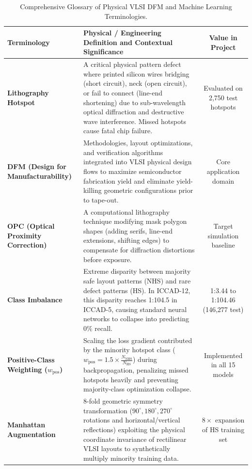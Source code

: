 \documentclass[11pt,journal,onecolumn]{IEEEtran}
\begin{document}
\begin{table}[htbp]
\caption{Comprehensive Glossary of Physical VLSI DFM and Machine Learning Terminologies.}
\label{tab:glossary}
\centering
\small
\begin{tabular}{p{4.2cm}p{9.8cm}c}
\toprule
\textbf{Terminology} & \textbf{Physical / Engineering Definition and Contextual Significance} & \textbf{Value in Project} \\
\midrule
\textbf{Lithography Hotspot} & A critical physical pattern defect where printed silicon wires bridging (short circuit), neck (open circuit), or fail to connect (line-end shortening) due to sub-wavelength optical diffraction and destructive wave interference. Missed hotspots cause fatal chip failure. & Evaluated on 2,750 test hotspots \\
\addlinespace
\textbf{DFM (Design for Manufacturability)} & Methodologies, layout optimizations, and verification algorithms integrated into VLSI physical design flows to maximize semiconductor fabrication yield and eliminate yield-killing geometric configurations prior to tape-out. & Core application domain \\
\addlinespace
\textbf{OPC (Optical Proximity Correction)} & A computational lithography technique modifying mask polygon shapes (adding serifs, line-end extensions, shifting edges) to compensate for diffraction distortions before exposure. & Target simulation baseline \\
\addlinespace
\textbf{Class Imbalance} & Extreme disparity between majority safe layout patterns (NHS) and rare defect patterns (HS). In ICCAD-12, this disparity reaches 1:104.5 in ICCAD-5, causing standard neural networks to collapse into predicting 0\% recall. & 1:3.44 to 1:104.46 (146,277 test) \\
\addlinespace
\textbf{Positive-Class Weighting ($w_{\text{pos}}$)} & Scaling the loss gradient contributed by the minority hotspot class ($w_{\text{pos}} = 1.5 \times \frac{N_{\text{NHS}}}{N_{\text{HS}}}$) during backpropagation, penalizing missed hotspots heavily and preventing majority-class optimization collapse. & Implemented in all 15 models \\
\addlinespace
\textbf{Manhattan Augmentation} & 8-fold geometric symmetry transformation ($90^\circ, 180^\circ, 270^\circ$ rotations and horizontal/vertical reflections) exploiting the physical coordinate invariance of rectilinear VLSI layouts to synthetically multiply minority training data. & $8\times$ expansion of HS training set \\

\end{tabular}
\end{table}
\end{document}
